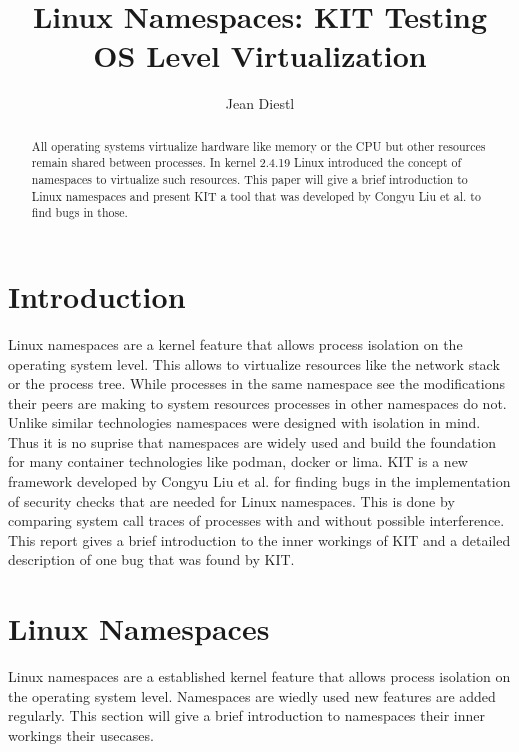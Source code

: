 \documentclass[10pt,twocolumn,a4paper]{article}
\author{Jean Diestl}
\begin{document}
\title{Linux Namespaces: KIT Testing OS Level Virtualization}

\newcommand{\todo}[1]{{\texttt{[#1]}}}
\newcommand{\code}[1]{{\tt \small{#1}}}

\maketitle

\lstset{language=C, basicstyle=\ttfamily,
        columns=fullflexible,
        string=[b]', showspaces=false, showtabs=false,
         captionpos=b,
        framerule=1pt,
        breaklines=true, breakatwhitespace=true,
        autogobble=true}

\begin{abstract}
All operating systems virtualize hardware like memory or the CPU but other resources remain shared between processes.
In kernel 2.4.19 Linux introduced the concept of namespaces to virtualize such resources. This paper will give a brief 
introduction to Linux namespaces and present KIT a tool that was developed by Congyu Liu et al. to
find bugs in those.
\end{abstract}

\section{Introduction}\label{sec:introduction}
Linux namespaces are a kernel feature that allows process isolation on the operating system level.
This allows to virtualize resources like the network stack or the process tree.
While processes in the same namespace see the modifications their peers are making to system resources
processes in other namespaces do not. Unlike similar technologies namespaces were designed with
isolation in mind. Thus it is no suprise that namespaces are widely used and build the foundation
for many container technologies like podman, docker or lima.
KIT is a new framework developed by Congyu Liu et al. for finding bugs in the implementation of
security checks that are needed for Linux namespaces\cite{0}. 
This is done by comparing system call traces of processes with and without possible interference.
This report gives a brief introduction to the inner
workings of KIT and a detailed description of one bug
that was found by KIT. 

\section{Linux Namespaces}
Linux namespaces are a established kernel feature that allows process isolation on the operating system level.
Namespaces are wiedly used new features are added regularly.
This section will give a brief introduction to namespaces their inner workings their usecases.
\end{document}
